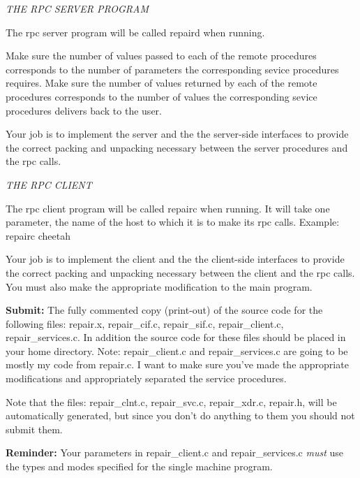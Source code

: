 \vfill\eject

{\it THE RPC SERVER PROGRAM}

The rpc server program will be called {\ltt{}repaird} when running.

Make sure the number of values passed to each of the remote procedures
corresponds to the number of parameters the corresponding
sevice procedures requires.
Make sure the number of values returned by each of the remote procedures
corresponds to the number of values the corresponding
sevice procedures delivers back to the user.

Your job is to implement the server and the
the server-side interfaces to provide the correct packing and unpacking
necessary between the server procedures and the rpc calls.

{\it THE RPC CLIENT}

The rpc client program will be called {\ltt{}repairc} when running.
It will take one parameter, the name of the host to which it is to make
its rpc calls.
Example: {\ltt{}repairc cheetah}

Your job is to implement the client and the
the client-side interfaces to provide the correct packing and unpacking
necessary between the client and the rpc calls.
You must also make the appropriate modification to the main program.

{\bf Submit:} The fully commented copy (print-out) of the source code
for the following files:
{\ltt{}repair.x},
{\ltt{}repair_cif.c},
{\ltt{}repair_sif.c},
{\ltt{}repair_client.c},
{\ltt{}repair_services.c}.
In addition the source code for these files should be placed in your home
directory.
Note: {\ltt{}repair_client.c} and {\ltt{}repair_services.c} are going
to be mostly my code from {\ltt{}repair.c}.
I want to make sure you've made the appropriate modifications
and appropriately separated the service procedures.

Note that the files:
{\ltt{}repair_clnt.c},
{\ltt{}repair_svc.c},
{\ltt{}repair_xdr.c},
{\ltt{}repair.h},
will be automatically generated, but since you don't do anything to them
you should not submit them.

\bigskip
{\bf Reminder:}
Your parameters in 
{\ltt{}repair_client.c} and
{\ltt{}repair_services.c} {\it must}
use the types and modes specified for the single machine program.

\bye
